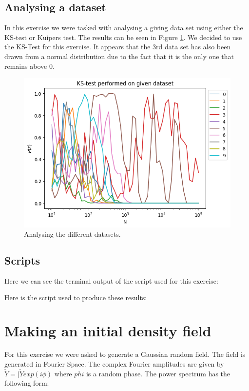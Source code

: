 \documentclass[a4paper,10pt]{article}
\begin{document}
\subsection{Analysing a dataset}

In this exercise we were tasked with analysing a giving data set using either the KS-test or Kuipers test. The results can be seen in Figure \ref{fig:1g}. We decided to use the KS-Test for this exercise. It appears that the 3rd data set has also been drawn from a normal distribution due to the fact that it is the only one that remains above 0.

\begin{figure}[h!]
  \centering
  \includegraphics[width=0.8\linewidth]{./plots/1g.png}
  \caption{Analysing the different datasets.}
  \label{fig:1g}
\end{figure}

\subsection{Scripts}

Here we can see the terminal output of the script used for this exercise:


Here is the script used to produce these results: 


\section{Making an initial density field}

For this exercise we were asked to generate a Gaussian random field. The field is generated in Fourier Space. The complex Fourier amplitudes are given by $\tilde{Y}=|\tilde{Y}exp(i\phi)$ where $phi$ is a random phase. The power spectrum has the following form: 
\end{document}
